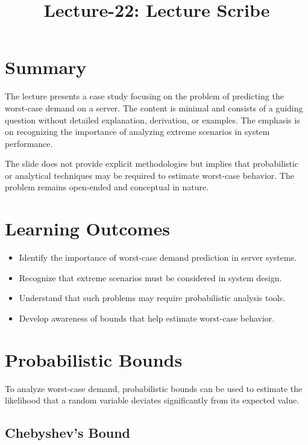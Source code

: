 \documentclass[12pt]{article}
\begin{document}
\title{Lecture-22: Lecture Scribe}
\author{}
\date{}
\maketitle

\section*{Summary}

The lecture presents a case study focusing on the problem of predicting the worst-case demand on a server. The content is minimal and consists of a guiding question without detailed explanation, derivation, or examples. The emphasis is on recognizing the importance of analyzing extreme scenarios in system performance.

The slide does not provide explicit methodologies but implies that probabilistic or analytical techniques may be required to estimate worst-case behavior. The problem remains open-ended and conceptual in nature.

\section*{Learning Outcomes}

\begin{itemize}
    \item Identify the importance of worst-case demand prediction in server systems.
    \item Recognize that extreme scenarios must be considered in system design.
    \item Understand that such problems may require probabilistic analysis tools.
    \item Develop awareness of bounds that help estimate worst-case behavior.
\end{itemize}

\section*{Probabilistic Bounds}

To analyze worst-case demand, probabilistic bounds can be used to estimate the likelihood that a random variable deviates significantly from its expected value.

\subsection*{Chebyshev's Bound}
\end{document}
